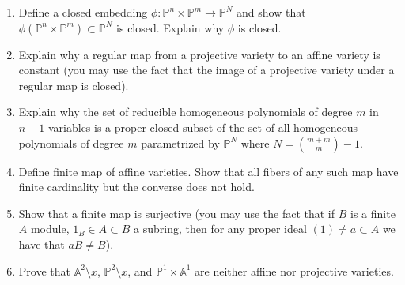 \documentclass[12pt]{amsart}
\begin{document}
\begin{enumerate}
\item Define a closed embedding $\phi : \mathbb P ^n\times \mathbb P ^m\to \mathbb P^N$ and show that $\phi ( \mathbb P ^n\times \mathbb P ^m)\subset  \mathbb P^N$ is closed. Explain why $\phi$ is closed.
\item Explain why a regular map from a projective variety to an affine variety is constant (you may use the fact that the image of a projective variety under a regular map is closed).
\item Explain why the set of reducible homogeneous polynomials of degree $m$ in $n+1$ variables is a proper closed subset of the set of all homogeneous polynomials of degree $m$ parametrized by $\mathbb P ^N$ where $N =\binom{m+m}m -1$.
\item Define finite map of affine varieties. Show that all fibers of any such map have finite cardinality but the converse does not hold.
\item Show that a finite map is surjective (you may use the fact that if $B$ is a finite $A$ module, $1_B\in A\subset B$ a subring, then for any proper ideal $(1)\ne a\subset A$ we have that $aB\ne B$).
\item Prove that $\mathbb A ^2\setminus x$, $\mathbb P ^2\setminus x$, and 
$\mathbb P^1\times \mathbb A ^1$ are neither affine nor projective varieties.  
\end{enumerate}
\end{document}
